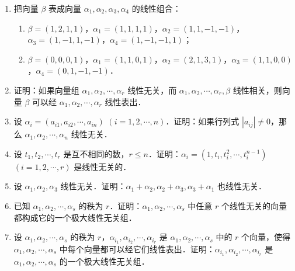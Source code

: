 \begin{enumerate}
\begin{enumerate}
\[\begin{cases}
        3x_1-2x_2+2x_3-3x_4=2,\\
        5x_1+x_2-x_3+2x_4=-1,\\
        2x_1-x_2+x_3-3x_4=4;
      \end{cases}
    \]
  \anssub
    \item \[
      \begin{cases}
        x_1+2x_2+3x_3-x_4=1,\\
        3x_1+2x_2+x_3-x_4=1,\\
        2x_1+3x_2+x_3+x_4=1,\\
        2x_1+2x_2+2x_3-x_4=1,\\
        5x_1+5x_2+2x_3=2.
      \end{cases}
    \]
  \anssub
  \end{enumerate}
  \item 把向量 $\beta$ 表成向量 $\alpha_1,\alpha_2,\alpha_3,\alpha_4$ 的线性组合：
  \begin{enumerate}
    \item $\beta=(1,2,1,1)$，$\alpha_1=(1,1,1,1)$，$\alpha_2=(1,1,-1,-1)$，$\alpha_3=(1,-1,1,-1)$，$\alpha_4=(1,-1,-1,1)$；
  \anssub
    \item $\beta=(0,0,0,1)$，$\alpha_1=(1,1,0,1)$，$\alpha_2=(2,1,3,1)$，$\alpha_3=(1,1,0,0)$，$\alpha_4=(0,1,-1,-1)$．
  \anssub
  \end{enumerate}
  \item 证明：如果向量组 $\alpha_1,\alpha_2,\cdots,\alpha_r$ 线性无关，而 $\alpha_1,\alpha_2,\cdots,\alpha_r,\beta$ 线性相关，则向量 $\beta$ 可以经 $\alpha_1,\alpha_2,\cdots,\alpha_r$ 线性表出．
  \ansproof
  \item 设 $\alpha_i=(a_{i1},a_{i2},\cdots,a_{in})$ $(i=1,2,\cdots,n)$．证明：如果行列式 $|a_{ij}|\ne 0$，那么 $\alpha_1,\alpha_2,\cdots,\alpha_n$ 线性无关．
  \ansproof
  \item 设 $t_1,t_2,\cdots,t_r$ 是互不相同的数，$r\le n$．证明：$\alpha_i=(1,t_i,t_i^2,\cdots,t_i^{n-1})$ $(i=1,2,\cdots,r)$ 是线性无关的．
  \ansproof
  \item 设 $\alpha_1,\alpha_2,\alpha_3$ 线性无关．证明：$\alpha_1+\alpha_2,\alpha_2+\alpha_3,\alpha_3+\alpha_1$ 也线性无关．
  \ansproof
  \item 已知 $\alpha_1,\alpha_2,\cdots,\alpha_s$ 的秩为 $r$．证明：$\alpha_1,\alpha_2,\cdots,\alpha_s$ 中任意 $r$ 个线性无关的向量都构成它的一个极大线性无关组．
  \ansproof
  \item 设 $\alpha_1,\allowbreak \alpha_2,\allowbreak \cdots,\allowbreak \alpha_s$ 的秩为 $r$，$\alpha_{i_1},\allowbreak \alpha_{i_2},\allowbreak \cdots,\allowbreak \alpha_{i_r}$ 是 $\alpha_1,\allowbreak \alpha_2,\allowbreak \cdots,\allowbreak \alpha_s$ 中的 $r$ 个向量，使得 $\alpha_1,\allowbreak \alpha_2,\allowbreak \cdots,\allowbreak \alpha_s$ 中每个向量都可以经它们线性表出．证明：$\alpha_{i_1},\allowbreak \alpha_{i_2},\allowbreak \cdots,\allowbreak \alpha_{i_r}$ 是 $\alpha_1,\allowbreak \alpha_2,\allowbreak \cdots,\allowbreak \alpha_s$ 的一个极大线性无关组．

\end{enumerate}
